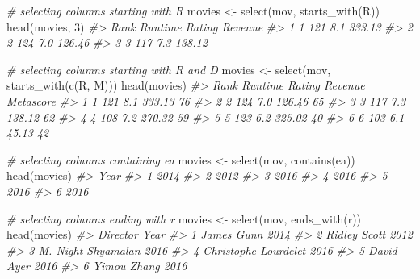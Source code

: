 \documentclass[
]{book}
\newenvironment{Shaded}{\begin{snugshade}}{\end{snugshade}}
\newcommand{\CommentTok}[1]{\textcolor[rgb]{0.56,0.35,0.01}{\textit{#1}}}
\newcommand{\DecValTok}[1]{\textcolor[rgb]{0.00,0.00,0.81}{#1}}
\newcommand{\FunctionTok}[1]{\textcolor[rgb]{0.00,0.00,0.00}{#1}}
\newcommand{\NormalTok}[1]{#1}
\newcommand{\OtherTok}[1]{\textcolor[rgb]{0.56,0.35,0.01}{#1}}
\newcommand{\StringTok}[1]{\textcolor[rgb]{0.31,0.60,0.02}{#1}}
\begin{document}
\begin{Shaded}
\begin{Highlighting}[]
\CommentTok{\# selecting columns starting with R}
\NormalTok{movies }\OtherTok{\textless{}{-}} \FunctionTok{select}\NormalTok{(mov, }\FunctionTok{starts\_with}\NormalTok{(}\StringTok{\textquotesingle{}R\textquotesingle{}}\NormalTok{))}
\FunctionTok{head}\NormalTok{(movies, }\DecValTok{3}\NormalTok{)}
\CommentTok{\#\textgreater{}   Rank Runtime Rating Revenue}
\CommentTok{\#\textgreater{} 1    1     121    8.1  333.13}
\CommentTok{\#\textgreater{} 2    2     124    7.0  126.46}
\CommentTok{\#\textgreater{} 3    3     117    7.3  138.12}

\CommentTok{\# selecting columns starting with R and D}
\NormalTok{movies }\OtherTok{\textless{}{-}} \FunctionTok{select}\NormalTok{(mov, }\FunctionTok{starts\_with}\NormalTok{(}\FunctionTok{c}\NormalTok{(}\StringTok{\textquotesingle{}R\textquotesingle{}}\NormalTok{, }\StringTok{\textquotesingle{}M\textquotesingle{}}\NormalTok{)))}
\FunctionTok{head}\NormalTok{(movies)}
\CommentTok{\#\textgreater{}   Rank Runtime Rating Revenue Metascore}
\CommentTok{\#\textgreater{} 1    1     121    8.1  333.13        76}
\CommentTok{\#\textgreater{} 2    2     124    7.0  126.46        65}
\CommentTok{\#\textgreater{} 3    3     117    7.3  138.12        62}
\CommentTok{\#\textgreater{} 4    4     108    7.2  270.32        59}
\CommentTok{\#\textgreater{} 5    5     123    6.2  325.02        40}
\CommentTok{\#\textgreater{} 6    6     103    6.1   45.13        42}

\CommentTok{\# selecting columns containing ea}
\NormalTok{movies }\OtherTok{\textless{}{-}} \FunctionTok{select}\NormalTok{(mov, }\FunctionTok{contains}\NormalTok{(}\StringTok{\textquotesingle{}ea\textquotesingle{}}\NormalTok{))}
\FunctionTok{head}\NormalTok{(movies)}
\CommentTok{\#\textgreater{}   Year}
\CommentTok{\#\textgreater{} 1 2014}
\CommentTok{\#\textgreater{} 2 2012}
\CommentTok{\#\textgreater{} 3 2016}
\CommentTok{\#\textgreater{} 4 2016}
\CommentTok{\#\textgreater{} 5 2016}
\CommentTok{\#\textgreater{} 6 2016}

\CommentTok{\# selecting columns ending with r}
\NormalTok{movies }\OtherTok{\textless{}{-}} \FunctionTok{select}\NormalTok{(mov, }\FunctionTok{ends\_with}\NormalTok{(}\StringTok{\textquotesingle{}r\textquotesingle{}}\NormalTok{))}
\FunctionTok{head}\NormalTok{(movies)}
\CommentTok{\#\textgreater{}               Director Year}
\CommentTok{\#\textgreater{} 1           James Gunn 2014}
\CommentTok{\#\textgreater{} 2         Ridley Scott 2012}
\CommentTok{\#\textgreater{} 3   M. Night Shyamalan 2016}
\CommentTok{\#\textgreater{} 4 Christophe Lourdelet 2016}
\CommentTok{\#\textgreater{} 5           David Ayer 2016}
\CommentTok{\#\textgreater{} 6          Yimou Zhang 2016}


\end{Highlighting}
\end{Shaded}
\end{document}
